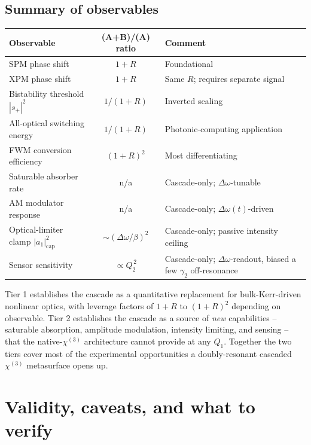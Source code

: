 \documentclass[11pt,a4paper]{article}
\newcommand{\chithree}{\chi^{(3)}}
\newcommand{\Dom}{\Delta\omega}
\begin{document}
\subsection{Summary of observables}

\begin{center}
\renewcommand{\arraystretch}{1.2}
\begin{tabular}{lcl}
\toprule
Observable & (A+B)/(A) ratio & Comment \\
\midrule
SPM phase shift                  & $1+R$       & Foundational \\
XPM phase shift                  & $1+R$       & Same $R$; requires separate signal \\
Bistability threshold $|s_+|^{2}$ & $1/(1+R)$  & Inverted scaling \\
All-optical switching energy     & $1/(1+R)$   & Photonic-computing application \\
FWM conversion efficiency        & $(1+R)^{2}$ & Most differentiating \\
\midrule
Saturable absorber rate          & n/a         & Cascade-only; $\Dom$-tunable \\
AM modulator response            & n/a         & Cascade-only; $\Dom(t)$-driven \\
Optical-limiter clamp $|a_1|^{2}_\text{cap}$ & $\sim(\Dom/\beta)^{2}$ &
   Cascade-only; passive intensity ceiling \\
Sensor sensitivity               & $\propto Q_2^{\,2}$ & Cascade-only; $\Dom$-readout, biased a few $\gamma_2$ off-resonance \\
\bottomrule
\end{tabular}
\end{center}

\noindent
Tier 1 establishes the cascade as a quantitative replacement for
bulk-Kerr-driven nonlinear optics, with leverage factors of
$1+R$ to $(1+R)^{2}$ depending on observable.  Tier 2 establishes the
cascade as a source of \emph{new} capabilities -- saturable
absorption, amplitude modulation, intensity limiting, and sensing --
that the native-$\chithree$ architecture cannot provide at any $Q_1$.
Together the two tiers cover most of the experimental opportunities a
doubly-resonant cascaded $\chithree$ metasurface opens up.

\section{Validity, caveats, and what to verify}\label{sec:validity}
\end{document}
